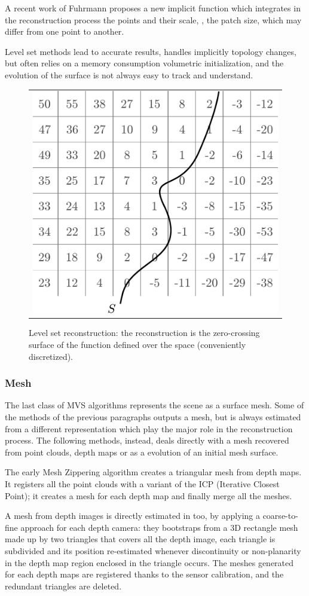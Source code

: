 A recent work of Fuhrmann \etal \cite{fuhrmann2014floating} proposes a new implicit function which integrates in the reconstruction process the points and their scale, \eg, the patch size, which may differ from one point to another. 


Level set methods lead to accurate results, handles implicitly topology changes, but often relies on a memory consumption volumetric initialization, and the evolution of the surface is not always easy to track and understand.


\begin{figure}[t]
\centering
 \begin{tabular}{c}
  \includegraphics[width=0.48\columnwidth]{./img/ch_soa/levelset}\\
 \end{tabular}
 \caption{Level set reconstruction: the reconstruction is the zero-crossing surface of the function defined over the space (conveniently discretized).}
 \label{fig:levelset}
\end{figure}
\subsubsection{Mesh}

The last class of MVS algorithms represents the scene as a surface mesh. Some of the methods of the previous paragraphs outputs a mesh, but is always estimated from a different representation which play the major role in the reconstruction process.
The following methods, instead, deals directly with a mesh recovered from point clouds, depth maps or as a evolution of an initial mesh surface.

The early Mesh Zippering algorithm \cite{turk1994zippered} creates a triangular mesh from depth maps. It registers all the point clouds with a variant of the ICP (Iterative Closest Point); it creates a mesh for each depth map and finally merge all the meshes.

A mesh from depth images is directly estimated in \cite{pollefeys_et_al_08} too, by applying a coarse-to-fine approach for each depth camera: they bootstraps from a 3D rectangle mesh made up by two triangles that covers all the depth image, each triangle is subdivided and its position re-estimated whenever discontinuity or non-planarity in the depth map region enclosed in the triangle occurs. The meshes generated for each depth maps are registered thanks to the sensor calibration, and the redundant triangles are deleted.

